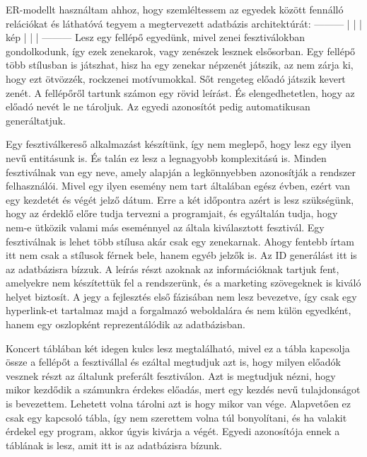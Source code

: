 \documentclass[11pt]{article}
\begin{document}
ER-modellt használtam ahhoz, hogy szemléltessem az egyedek között fennálló relációkat és láthatóvá tegyem a megtervezett adatbázis architektúrát:
---------
|		|
|	kép	|
|		|
---------
Lesz egy fellépő egyedünk, mivel zenei fesztiválokban gondolkodunk, így ezek zenekarok, vagy zenészek lesznek elsősorban. Egy fellépő több stílusban is játszhat, hisz ha egy zenekar népzenét játszik, az nem zárja ki, hogy ezt ötvözzék, rockzenei motívumokkal. Sőt rengeteg előadó játszik kevert zenét. A fellépőről tartunk számon egy rövid leírást. És elengedhetetlen, hogy az előadó nevét le ne tároljuk. Az egyedi azonosítót pedig automatikusan generáltatjuk. 

Egy fesztiválkereső alkalmazást készítünk, így nem meglepő, hogy lesz egy ilyen nevű entitásunk is. És talán ez lesz a legnagyobb komplexitású is. Minden fesztiválnak van egy neve, amely alapján a legkönnyebben azonosítják a rendszer felhasználói. Mivel egy ilyen esemény nem tart általában egész évben, ezért van egy kezdetét és végét jelző dátum. Erre a két időpontra azért is lesz szükségünk, hogy az érdeklő előre tudja  tervezni a programjait, és egyáltalán tudja, hogy nem-e ütközik valami más eseménnyel az általa kiválasztott fesztivál. Egy fesztiválnak is lehet több stílusa akár csak egy zenekarnak. Ahogy fentebb írtam itt nem csak a stílusok férnek bele, hanem egyéb jelzők is. Az ID generálást itt is az adatbázisra bízzuk. A leírás részt azoknak az információknak tartjuk fent, amelyekre nem készítettük fel a rendszerünk, és a marketing szövegeknek is kiváló helyet biztosít. A jegy a fejlesztés első fázisában nem lesz bevezetve, így csak egy hyperlink-et tartalmaz majd a forgalmazó weboldalára és nem külön egyedként, hanem egy oszlopként reprezentálódik az adatbázisban.

Koncert táblában két idegen kulcs lesz megtalálható, mivel ez a tábla kapcsolja össze a fellépőt a fesztivállal és ezáltal megtudjuk azt is, hogy milyen előadók vesznek részt az általunk preferált fesztiválon. Azt is megtudjuk nézni, hogy mikor kezdődik a számunkra érdekes előadás, mert egy kezdés nevű tulajdonságot is bevezettem. Lehetett volna tárolni azt is hogy mikor van vége. Alapvetően ez csak egy kapcsoló tábla, így nem szerettem volna túl bonyolítani, és ha valakit érdekel egy program, akkor úgyis kivárja a végét. Egyedi azonosítója ennek a táblának is lesz, amit itt is az adatbázisra bízunk.
\end{document}
